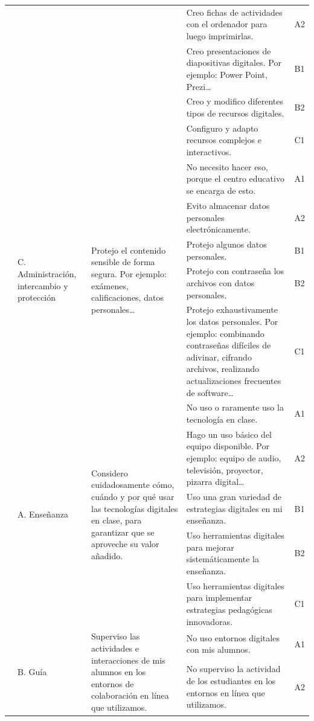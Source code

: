 \documentclass[spanish]{textolivre}
\begin{document}
\begin{small}
\begin{longtable}{
    >{\raggedright\arraybackslash}p{}
    p{}
    p{}
    p{}
    p{}
    }
\\
& & & Creo fichas de actividades con el ordenador para luego imprimirlas. & A2
\\
& & & Creo presentaciones de diapositivas digitales. Por ejemplo: Power Point, Prezi… & B1
\\
& & & Creo y modifico diferentes tipos de recursos digitales. & B2
\\
& & & Configuro y adapto recursos complejos e interactivos. & C1
\\
\cmidrule{2-5}
& \multirow{5}{=}{C. Administración, intercambio y protección} & \multirow{5}{=}{Protejo el contenido sensible de forma segura. Por ejemplo: exámenes, calificaciones, datos personales…} & No necesito hacer eso, porque el centro educativo se encarga de esto. & A1
\\
& & & Evito almacenar datos personales electrónicamente. & A2
\\
& & & Protejo algunos datos personales. & B1
\\
& & & Protejo con contraseña los archivos con datos personales. & B2
\\
& & & Protejo exhaustivamente los datos personales. Por ejemplo: combinando contraseñas difíciles de adivinar, cifrando archivos, realizando actualizaciones frecuentes de software… & C1
\\
\midrule
\multirow{20}{=}{3. Pedagogía digital} & \multirow{5}{=}{A. Enseñanza} & \multirow{5}{=}{Considero cuidadosamente cómo, cuándo y por qué usar las tecnologías digitales en clase, para garantizar que se aproveche su valor añadido.} & No uso o raramente uso la tecnología en clase. & A1
\\
& & & Hago un uso básico del equipo disponible. Por ejemplo: equipo de audio, televisión, proyector, pizarra digital… & A2
\\
& & & Uso una gran variedad de estrategias digitales en mi enseñanza. & B1
\\
& & & Uso herramientas digitales para mejorar sistemáticamente la enseñanza. & B2
\\
& & & Uso herramientas digitales para implementar estrategias pedagógicas innovadoras. & C1
\\
\cmidrule{2-5}
& \multirow{5}{=}{B. Guía} & \multirow{5}{=}{Superviso las actividades e interacciones de mis alumnos en los entornos de colaboración en línea que utilizamos.} & No uso entornos digitales con mis alumnos. & A1
\\
& & & No superviso la actividad de los estudiantes en los entornos en línea que utilizamos. & A2

\end{longtable}
\end{small}
\end{document}

